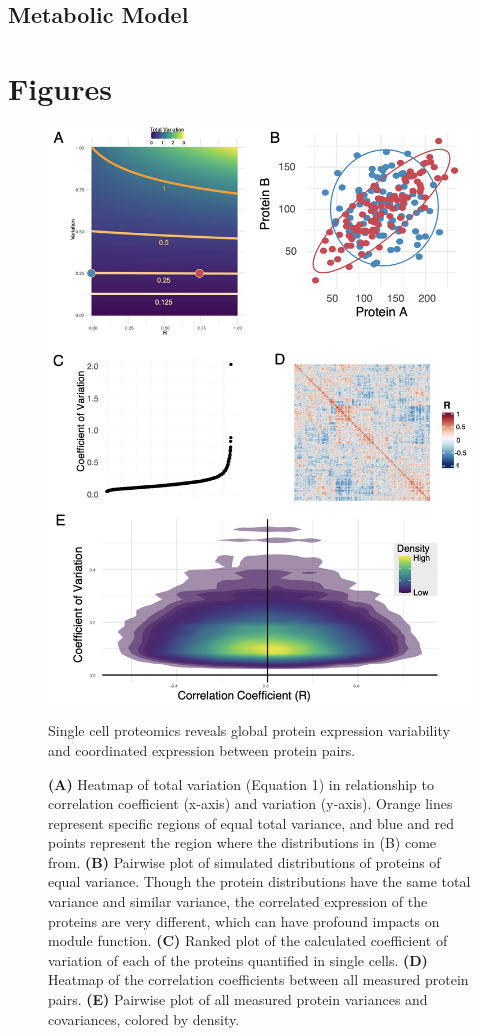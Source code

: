 \subsection{Metabolic Model}


\section{Figures}
\begin{figure}[hbt!]
\centering
\includegraphics[width=12cm, keepaspectratio]{figs/paper2/fig1.png}
\caption{Single cell proteomics reveals global protein expression variability and coordinated expression between protein pairs.}
\caption*{\textbf{(A)} Heatmap of total variation (Equation 1) in relationship to correlation coefficient (x-axis) and variation (y-axis). Orange lines represent specific regions of equal total variance, and blue and red points represent the region where the distributions in (B) come from. \textbf{(B)} Pairwise plot of simulated distributions of proteins of equal variance. Though the protein distributions have the same total variance and similar variance, the correlated expression of the proteins are very different, which can have profound impacts on module function. \textbf{(C)} Ranked plot of the calculated coefficient of variation of each of the proteins quantified in single cells. \textbf{(D)} Heatmap of the correlation coefficients between all measured protein pairs. \textbf{(E)} Pairwise plot of all measured protein variances and covariances, colored by density.}
\label{fig:paper2_fig1}
\end{figure}

